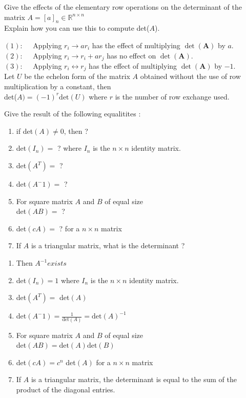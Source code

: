 \documentclass[12pt]{article}
\newcommand*{\xfield}[1]{\begin{mdframed}\centering #1\end{mdframed}\bigskip}
\newenvironment{note}{}{}
\begin{document}
\begin{note}
	\xfield{Give the effects of the elementary row operations on the determinant of the matrix $A = [a]_n \in \mathbb{R}^{n\times n}$\\
	Explain how you can use this to compute det($A$).}
	\xfield{$(1): \quad$ Applying $r_i \to ar_i$ has the effect of multiplying $\det \left({\mathbf A}\right)$ by $a$.\\
$(2): \quad$ Applying $r_i \to r_i + ar_j$ has no effect on $\det \left({\mathbf A}\right)$.\\
$(3): \quad$ Applying $r_i \leftrightarrow r_j$ has the effect of multiplying $\det \left({\mathbf A}\right)$ by $-1$.\\
Let $U$ be the echelon form of the matrix $A$ obtained without the use of row multiplication by a constant, then \\
det($A) = (-1)^r \text{det}(U)$ where $r$ is the number of row exchange used.}
\end{note}

\begin{note}
	\xfield{Give the result of the following equalitites :\\
	\begin{enumerate}
	\item if det$(A) \neq 0$, then ?
	\item det$(I_n) =$ ? where $I_n$ is the $n \times n$ identity matrix.
	\item det$(A^T) =$ ?
	\item det$(A^-1) =$ ?
	\item For square matrix $A$ and $B$ of equal size\\
	det$(AB) =$ ?
	\item det$(cA) =$ ? for a $n \times n$ matrix
	\item If $A$ is a triangular matrix, what is the determinant ?
	\end{enumerate} }
	\xfield{\begin{enumerate}
	\item Then $A^{-1} exists$
	\item det$(I_n) = 1$ where $I_n$ is the $n \times n$ identity matrix.
	\item det$(A^T) =$ det$(A)$
	\item det$(A^-1) = \frac{1}{\text{det}(A)} = \text{det}(A)^{-1}$
	\item For square matrix $A$ and $B$ of equal size\\
	det$(AB) = \text{det}(A)\text{det}(B)$
	\item det$(cA) = c^n$ det$(A)$ for a $n \times n$ matrix
	\item If $A$ is a triangular matrix, the determinant is equal to the sum of the product of the diagonal entries.
	\end{enumerate} }
\end{note}
\end{document}
